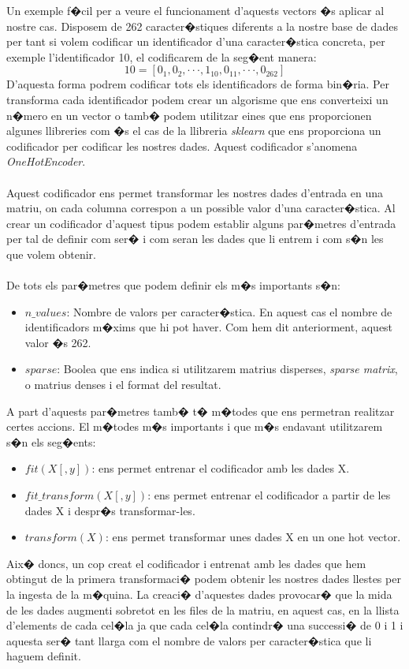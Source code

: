\documentclass[12pt,a4paper,openright,oneside]{article}
\numberwithin{equation}{section}
\theoremstyle{definition}
\begin{document}
Un exemple f�cil per a veure el funcionament d'aquests vectors �s aplicar al nostre cas. Disposem de 262 caracter�stiques diferents a la nostre base de dades per tant si volem codificar un identificador d'una caracter�stica concreta, per exemple l'identificador 10, el codificarem de la seg�ent manera:
\[10 = [0_1,0_2, \cdot \cdot \cdot, 1_{10}, 0_{11}, \cdot \cdot \cdot, 0_{262}]\]
D'aquesta forma podrem codificar tots els identificadors de forma bin�ria. Per transforma cada identificador podem crear un algorisme que ens converteixi un n�mero en un vector o tamb� podem utilitzar eines que ens proporcionen algunes llibreries com �s el cas de la llibreria \textit{sklearn} que ens proporciona un codificador per codificar les nostres dades. Aquest codificador s'anomena \textit{OneHotEncoder}\cite{sklearnOnehotencoder}. \\\\
Aquest codificador ens permet transformar les nostres dades d'entrada en una matriu, on cada columna correspon a un possible valor d'una caracter�stica. Al crear un codificador d'aquest tipus podem establir alguns par�metres d'entrada per tal de definir com ser� i com seran les dades que li entrem i com s�n les que volem obtenir.\\\\
De tots els par�metres que podem definir els m�s importants s�n:
\begin{itemize}
\item ${n\_values}$: Nombre de valors per caracter�stica. En aquest cas el nombre de identificadors m�xims que hi pot haver. Com hem dit anteriorment, aquest valor �s 262. 
\item ${sparse}$: Boolea que ens indica si utilitzarem matrius disperses, \textit{sparse matrix}, o matrius denses i el format del resultat.
\end{itemize}
A part d'aquests par�metres tamb� t� m�todes que ens permetran realitzar certes accions. El m�todes m�s importants i que m�s endavant utilitzarem s�n els seg�ents:
\begin{itemize}
\item ${fit (X[,y])}$: ens permet entrenar el codificador amb les dades X.
\item ${fit\_transform (X[,y])}$: ens permet entrenar el codificador a partir de les dades X i despr�s transformar-les.
\item ${transform(X)}$: ens permet transformar unes dades X en un one hot vector.
\end{itemize}
Aix� doncs, un cop creat el codificador i entrenat amb les dades que hem obtingut de la primera transformaci� podem obtenir les nostres dades llestes per la ingesta de la m�quina. La creaci� d'aquestes dades provocar� que la mida de les dades augmenti sobretot en les files de la matriu, en aquest cas, en la llista d'elements de cada cel�la ja que cada cel�la contindr� una successi� de 0 i 1 i aquesta ser� tant llarga com el nombre de valors per caracter�stica que li haguem definit.
\end{document}
